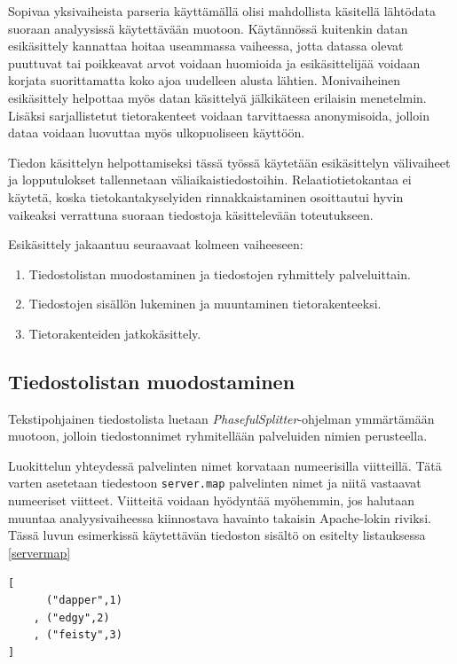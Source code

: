 Sopivaa yksivaiheista parseria käyttämällä olisi mahdollista käsitellä
lähtödata suoraan analyysissä käytettävään muotoon. Käytännössä
kuitenkin datan esikäsittely kannattaa hoitaa useammassa vaiheessa,
jotta datassa olevat puuttuvat tai poikkeavat arvot voidaan huomioida
ja esikäsittelijää voidaan korjata suorittamatta koko ajoa uudelleen
alusta lähtien. Monivaiheinen esikäsittely helpottaa myös datan
käsittelyä jälkikäteen erilaisin menetelmin. Lisäksi sarjallistetut
tietorakenteet voidaan tarvittaessa anonymisoida, jolloin dataa
voidaan luovuttaa myös ulkopuoliseen käyttöön.

Tiedon käsittelyn helpottamiseksi tässä työssä käytetään esikäsittelyn
välivaiheet ja lopputulokset tallennetaan väliaikaistiedostoihin.
Relaatiotietokantaa ei käytetä, koska tietokantakyselyiden
rinnakkaistaminen osoittautui hyvin vaikeaksi verrattuna suoraan
tiedostoja käsittelevään toteutukseen.

Esikäsittely jakaantuu seuraavaat kolmeen vaiheeseen:

\begin{enumerate}
\item Tiedostolistan muodostaminen ja tiedostojen ryhmittely palveluittain.
\item Tiedostojen sisällön lukeminen ja muuntaminen tietorakenteeksi.
\item Tietorakenteiden jatkokäsittely.
\end{enumerate}

\subsection{Tiedostolistan muodostaminen}

Tekstipohjainen tiedostolista luetaan
\textit{PhasefulSplitter}-ohjelman ymmärtämään muotoon, jolloin
tiedostonnimet ryhmitellään palveluiden nimien perusteella. 

Luokittelun yhteydessä palvelinten nimet korvataan numeerisilla
viitteillä. Tätä varten asetetaan tiedestoon \texttt{server.map}
palvelinten nimet ja niitä vastaavat numeeriset viitteet. Viitteitä
voidaan hyödyntää myöhemmin, jos halutaan muuntaa analyysivaiheessa
kiinnostava havainto takaisin Apache-lokin riviksi. Tässä luvun
esimerkissä käytettävän tiedoston sisältö on esitelty listauksessa
\ref{servermap}

\begin{lstlisting}[language=MyHaskell,float=h,caption=Tiedoston server.map sisältö.,label=servermap,aboveskip=1cm]
[
      ("dapper",1)
    , ("edgy",2)
    , ("feisty",3)
]
\end{lstlisting}

